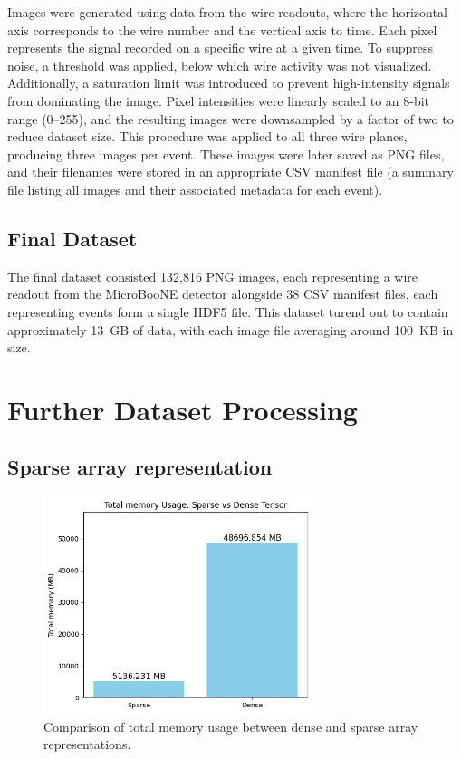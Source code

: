 \documentclass{pracalicmgr}
\begin{document}
Images were generated using data from the wire readouts, where the horizontal axis corresponds to the wire number and the vertical axis to time. Each pixel represents the signal recorded on a specific wire at a given time. To suppress noise, a threshold was applied, below which wire activity was not visualized. Additionally, a saturation limit was introduced to prevent high-intensity signals from dominating the image. Pixel intensities were linearly scaled to an 8-bit range (0--255), and the resulting images were downsampled by a factor of two to reduce dataset size. This procedure was applied to all three wire planes, producing three images per event. These images were later saved as PNG files, and their filenames were stored in an appropriate CSV manifest file (a summary file listing all images and their associated metadata for each event).

\subsection{Final Dataset}

The final dataset consisted 132,816 PNG images, each representing a wire readout from the MicroBooNE detector alongside 38 CSV manifest files, each representing events form a single HDF5 file. This dataset turend out to contain approximately 13~GB of data, with each image file averaging around 100~KB in size.

\section{Further Dataset Processing}

\subsection{Sparse array representation}

\begin{figure}[H]
    \centering
    \includegraphics[width=0.7\textwidth]{src/totalSparseDense.png}
    \caption{Comparison of total memory usage between dense and sparse array representations.}
    \label{fig:memRedTot}
\end{figure}
\end{document}
